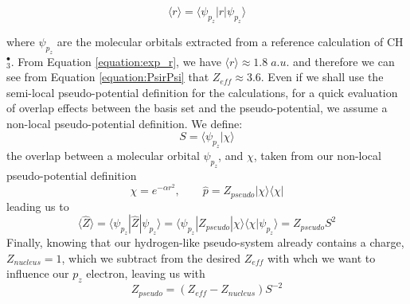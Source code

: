 \documentclass[12pt]{article}
\begin{document}
\begin{equation}
\langle r \rangle = \langle \psi_{p_{z}} | r | \psi_{p_{z}} \rangle
\label{equation:exp_r}
\end{equation}


 where \(\psi_{p_{z}}\) are the molecular orbitals extracted from a reference calculation of CH\(^{\bullet}_{3}\). From Equation \ref{equation:exp_r}, we have \( \langle r \rangle \approx 1.8\;a.u.\) and therefore we can see from Equation \ref{equation:PsirPsi} that \(Z_{eff} \approx 3.6\). Even if we shall use the semi-local pseudo-potential definition for the calculations, for a quick evaluation of overlap effects between the basis set and the pseudo-potential, we assume a non-local pseudo-potential definition. We define:
\begin{equation}
S = \langle \psi_{p_{z}} | \chi \rangle
\end{equation}
the overlap between a molecular orbital \(\psi_{p_{z}}\), and \(\chi\), taken from our non-local pseudo-potential definition \cite{huzinaga_effective_1991}
\begin{equation}
\chi = e^{-\alpha r^{2}},\qquad \widehat{p} = Z_{pseudo} | \chi \rangle \langle \chi |
\end{equation}
leading us to
\begin{equation}
\langle \widehat{Z} \rangle = \langle \psi_{p_{z}} | \widehat{Z} | \psi_{p_{z}} \rangle = \langle \psi_{p_{z}} | Z_{pseudo} | \chi \rangle \langle \chi | \psi_{p_{z}} \rangle = Z_{pseudo} S^{2}
\end{equation}
Finally, knowing that our hydrogen-like pseudo-system already contains a charge, \(Z_{nucleus}=1\), which we subtract from the desired \(Z_{eff}\) with whch we want to influence our \(p_{z}\) electron, leaving us with
\begin{equation}
Z_{pseudo} = (Z_{eff} - Z_{nucleus})S^{-2}
\end{equation}
\end{document}
